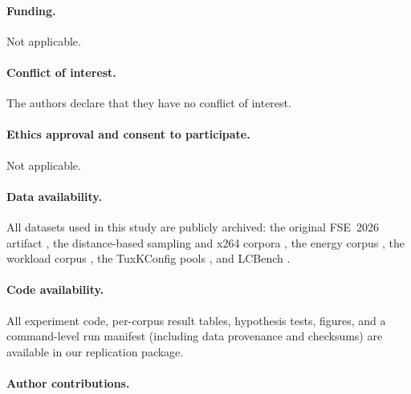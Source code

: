 \documentclass[smallcondensed]{svjour3}
\begin{document}
\paragraph{Funding.}
Not applicable.

\paragraph{Conflict of interest.}
The authors declare that they have no conflict of interest.

\paragraph{Ethics approval and consent to participate.}
Not applicable.

\paragraph{Data availability.}
All datasets used in this study are publicly archived: the original
FSE~2026 artifact \citep{weis2026artifact}, the distance-based sampling
and x264 corpora \citep{kaltenecker2019distance,pereira2020sampling}, the
energy corpus \citep{weber2023twins}, the workload corpus
\citep{muehlbauer2023workload}, the TuxKConfig pools
\citep{martin2022transfer}, and LCBench \citep{zimmer2021autopytorch}.

\paragraph{Code availability.}
All experiment code, per-corpus result tables, hypothesis tests, figures,
and a command-level run manifest (including data provenance and
checksums) are available in our replication package.

\paragraph{Author contributions.}


\end{document}
